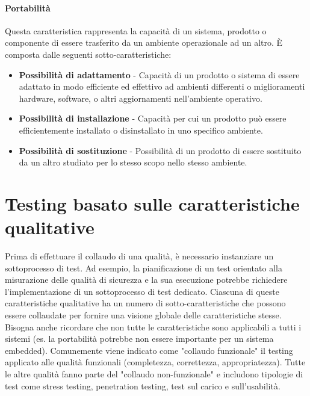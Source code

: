 \paragraph{Portabilità}
Questa caratteristica rappresenta la capacità di un sistema, prodotto o componente di essere trasferito da un ambiente operazionale ad un altro.
È composta dalle seguenti sotto-caratteristiche:
\begin{itemize}
\item \textbf{Possibilità di adattamento} - Capacità di un prodotto o sistema di essere adattato in modo efficiente ed effettivo ad ambienti differenti o miglioramenti hardware, software, o altri aggiornamenti nell'ambiente operativo.
\item \textbf{Possibilità di installazione} - Capacità per cui un prodotto può essere efficientemente installato o disinstallato in uno specifico ambiente.
\item \textbf{Possibilità di sostituzione} - Possibilità di un prodotto di essere sostituito da un altro studiato per lo stesso scopo nello stesso ambiente.
\end{itemize}

\section{Testing basato sulle caratteristiche qualitative}
Prima di effettuare il collaudo di una qualità, è necessario instanziare un sottoprocesso di test. Ad esempio, la pianificazione di un test orientato alla misurazione delle qualità di sicurezza e la sua esecuzione potrebbe richiedere l'implementazione di un sottoprocesso di test dedicato.
Ciascuna di queste caratteristiche qualitative ha un numero di sotto-caratteristiche che possono essere collaudate per fornire una visione globale delle caratteristiche stesse. Bisogna anche ricordare che non tutte le caratteristiche sono applicabili a tutti i sistemi (es. la portabilità potrebbe non essere importante per un sistema embedded).
Comunemente viene indicato come "collaudo funzionale" il testing applicato alle qualità funzionali (completezza, correttezza, appropriatezza). Tutte le altre qualità fanno parte del "collaudo non-funzionale" e includono tipologie di test come stress testing, penetration testing, test sul carico e sull'usabilità.\cite{iso29119}

